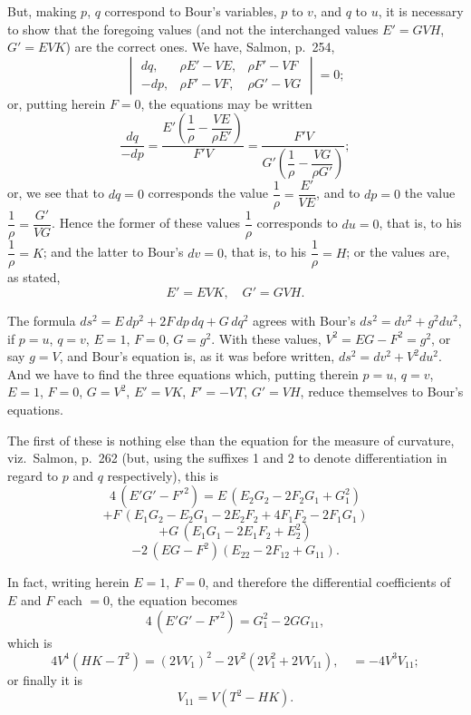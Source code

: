 \documentclass[11pt,a4paper]{article}
\begin{document}
But, making $p$, $q$ correspond to Bour's variables, $p$ to $v$, and
$q$ to $u$, it is necessary to show that the foregoing values (and not
the interchanged values $E'=GVH$, $G'=EVK$) are the correct ones. We
have, Salmon, p.~254,
\[
  \begin{vmatrix} dq, & \rho E'-VE, & \rho F'-VF\\ -dp, & \rho F'-VF, & \rho G'-VG \end{vmatrix}=0;
\]
or, putting herein $F=0$, the equations may be written
\[
  \frac{dq}{-dp}=\frac{E'\!\left(\dfrac{1}{\rho}-\dfrac{VE}{\rho E'}\right)}{F'V}=\frac{F'V}{G'\!\left(\dfrac{1}{\rho}-\dfrac{VG}{\rho G'}\right)};
\]
or, we see that to $dq=0$ corresponds the value $\dfrac{1}{\rho}=\dfrac{E'}{VE}$,
and to $dp=0$ the value $\dfrac{1}{\rho}=\dfrac{G'}{VG}$.
Hence the former of these values $\dfrac{1}{\rho}$ corresponds to $du=0$, that
is, to his $\dfrac{1}{\rho}=K$; and the latter to Bour's $dv=0$, that is, to his
$\dfrac{1}{\rho}=H$; or the values are, as stated,
\[
  E'=EVK,\quad G'=GVH.
\]

The formula $ds^{2}=E\,dp^{2}+2F\,dp\,dq+G\,dq^{2}$ agrees with Bour's
$ds^{2}=dv^{2}+g^{2}du^{2}$, if $p=u$, $q=v$, $E=1$, $F=0$, $G=g^{2}$.
With these values, $V^{2}=EG-F^{2}=g^{2}$, or say $g=V$, and Bour's
equation is, as it was before written, $ds^{2}=dv^{2}+V^{2}du^{2}$.
And we have to find the three equations which, putting therein $p=u$,
$q=v$, $E=1$, $F=0$, $G=V^{2}$, $E'=VK$, $F'=-VT$, $G'=VH$, reduce
themselves to Bour's equations.

The first of these is nothing else than the equation for the measure of
curvature, viz.\ Salmon, p.~262 (but, using the suffixes 1 and 2 to
denote differentiation in regard to $p$ and $q$ respectively), this is
\[
  4\,(E'G'-F'^{2})=E\,(E_{2}G_{2}-2F_{2}G_{1}+G_{1}^{2})
\]
\[
  +F\,(E_{1}G_{2}-E_{2}G_{1}-2E_{2}F_{2}+4F_{1}F_{2}-2F_{1}G_{1})
\]
\[
  +G\,(E_{1}G_{1}-2E_{1}F_{2}+E_{2}^{2})
\]
\[
  -2\,(EG-F^{2})(E_{22}-2F_{12}+G_{11}).
\]

\newpage
\noindent
In fact, writing herein $E=1$, $F=0$, and therefore the differential
coefficients of $E$ and $F$ each $=0$, the equation becomes
\[
  4\,(E'G'-F'^{2})=G_{1}^{2}-2GG_{11},
\]
which is
\[
  4V^{4}(HK-T^{2})=(2VV_{1})^{2}-2V^{2}(2V_{1}^{2}+2VV_{11}),\quad =-4V^{3}V_{11};
\]
or finally it is
\[
  V_{11}=V(T^{2}-HK).
\]
\end{document}
